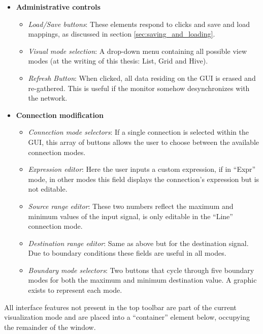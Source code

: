 \begin{itemize}
	\item \textbf{Administrative controls}
	\begin{itemize}
		\item\emph{Load/Save buttons}: These elements respond to clicks and save and load mappings, as discussed in section \ref{sec:saving_and_loading}.
		\item\emph{Visual mode selection}: A drop-down menu containing all possible view modes (at the writing of this thesis: List, Grid and Hive).
		\item\emph{Refresh Button}: When clicked, all data residing on the GUI is erased and re-gathered. This is useful if the monitor somehow desynchronizes with the network.
	\end{itemize}

	\item \textbf{Connection modification}
	\begin{itemize}
		\item\emph{Connection mode selectors}: If a single connection is selected within the GUI, this array of buttons allows the user to choose between the available connection modes.
		\item\emph{Expression editor}: Here the user inputs a custom expression, if in ``Expr'' mode, in other modes this field displays the connection's expression but is not editable.
		\item\emph{Source range editor}: These two numbers reflect the maximum and minimum values of the input signal, is only editable in the ``Line'' connection mode.
		\item\emph{Destination range editor}: Same as above but for the destination signal. Due to boundary conditions these fields are useful in all modes.
		\item\emph{Boundary mode selectors}: Two buttons that cycle through five boundary modes for both the maximum and minimum destination value. A graphic exists to represent each mode.
	\end{itemize}
\end{itemize}

All interface features not present in the top toolbar are part of the current visualization mode and are placed into a ``container'' element below, occupying the remainder of the window.





